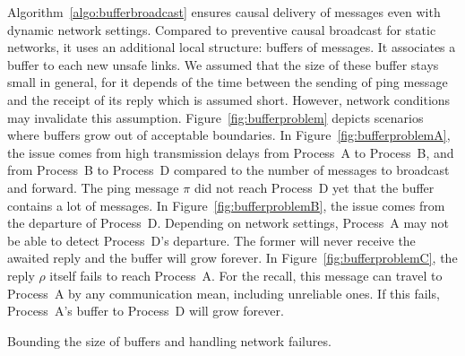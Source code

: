 Algorithm~\ref{algo:bufferbroadcast} ensures causal delivery of messages even
with dynamic network settings. Compared to preventive causal broadcast for
static networks, it uses an additional local structure: buffers of messages. It
associates a buffer to each new unsafe links. We assumed that the
size of these buffer stays small in general, for it depends of the time between
the sending of ping message and the receipt of its reply which is
assumed short. However, network conditions may invalidate this
assumption. Figure~\ref{fig:bufferproblem} depicts scenarios where buffers grow
out of acceptable boundaries. In Figure~\ref{fig:bufferproblemA}, the issue
comes from high transmission delays from Process~A to Process~B, and from
Process~B to Process~D compared to the number of messages to broadcast and
forward. The ping message $\pi$ did not reach Process~D yet that the buffer
contains a lot of messages. In Figure~\ref{fig:bufferproblemB}, the issue comes
from the departure of Process~D. Depending on network settings, Process~A may
not be able to detect Process~D's departure. The former will never receive the
awaited reply and the buffer will grow forever. In
Figure~\ref{fig:bufferproblemC}, the reply $\rho$ itself fails to
reach Process~A. For the recall, this message can travel to Process~A by any
communication mean, including unreliable ones. If this fails, Process~A's buffer
to Process~D will grow forever. %

\begin{algorithm}
  
  \caption{\label{algo:boundingbuffer}Bounding the size of buffers and handling
    network failures.}
\end{algorithm}

